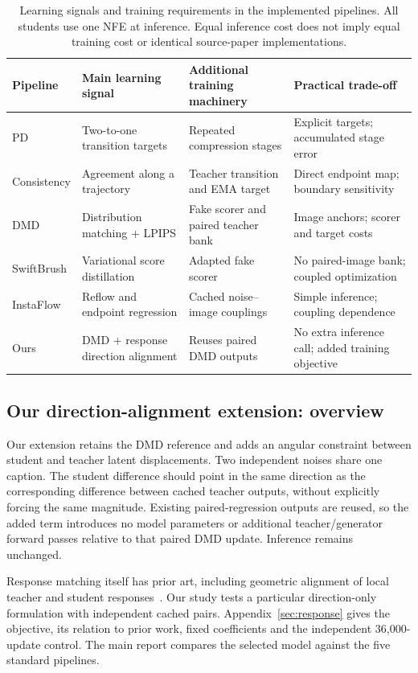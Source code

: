 \documentclass[10pt,twocolumn,letterpaper]{article}
\begin{document}
\begin{table}[t]
\centering\small
\setlength{\tabcolsep}{4pt}
\begin{tabularx}{\textwidth}{lXXX}
\toprule
Pipeline & Main learning signal & Additional training machinery & Practical trade-off \\
\midrule
PD & Two-to-one transition targets & Repeated compression stages & Explicit targets; accumulated stage error \\
Consistency & Agreement along a trajectory & Teacher transition and EMA target & Direct endpoint map; boundary sensitivity \\
DMD & Distribution matching + LPIPS & Fake scorer and paired teacher bank & Image anchors; scorer and target costs \\
SwiftBrush & Variational score distillation & Adapted fake scorer & No paired-image bank; coupled optimization \\
InstaFlow & Reflow and endpoint regression & Cached noise--image couplings & Simple inference; coupling dependence \\
Ours & DMD + response direction alignment & Reuses paired DMD outputs & No extra inference call; added training objective \\
\bottomrule
\end{tabularx}
\caption{Learning signals and training requirements in the implemented pipelines.
All students use one NFE at inference. Equal inference cost does not imply
equal training cost or identical source-paper implementations.}
\label{tab:taxonomy}
\end{table}

\subsection{Our direction-alignment extension: overview}
Our extension retains the DMD reference and adds an angular constraint
between student and teacher latent displacements. Two independent noises
share one caption. The student difference should point in the same direction
as the corresponding difference between cached teacher outputs, without
explicitly forcing the same magnitude. Existing paired-regression outputs
are reused, so the added term introduces no model parameters or additional
teacher/generator forward passes relative to that paired DMD update.
Inference remains unchanged.

Response matching itself has prior art, including geometric alignment of
local teacher and student responses~\cite{huang2026gad}. Our study tests a
particular direction-only formulation with independent cached pairs.
Appendix~\ref{sec:response} gives the objective, its relation to prior work,
fixed coefficients and the independent 36,000-update control. The main
report compares the selected model against the five standard pipelines.
\end{document}
